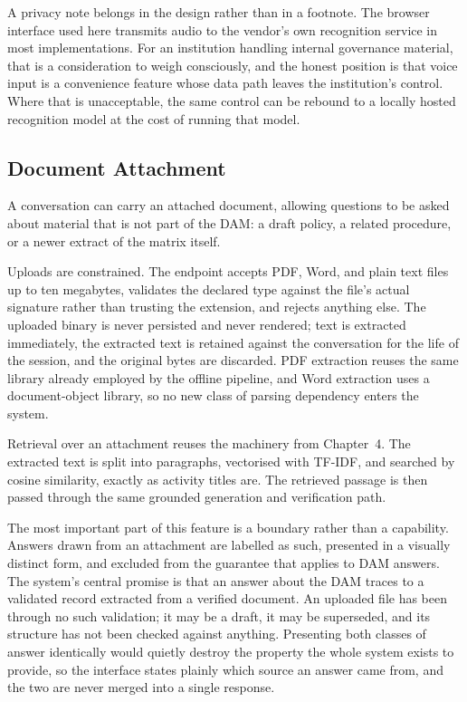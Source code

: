 A privacy note belongs in the design rather than in a footnote. The browser interface used here transmits audio to the vendor's own recognition service in most implementations. For an institution handling internal governance material, that is a consideration to weigh consciously, and the honest position is that voice input is a convenience feature whose data path leaves the institution's control. Where that is unacceptable, the same control can be rebound to a locally hosted recognition model at the cost of running that model.

\subsection{Document Attachment}

A conversation can carry an attached document, allowing questions to be asked about material that is not part of the DAM: a draft policy, a related procedure, or a newer extract of the matrix itself.

Uploads are constrained. The endpoint accepts PDF, Word, and plain text files up to ten megabytes, validates the declared type against the file's actual signature rather than trusting the extension, and rejects anything else. The uploaded binary is never persisted and never rendered; text is extracted immediately, the extracted text is retained against the conversation for the life of the session, and the original bytes are discarded. PDF extraction reuses the same library already employed by the offline pipeline, and Word extraction uses a document-object library, so no new class of parsing dependency enters the system.

Retrieval over an attachment reuses the machinery from Chapter~4. The extracted text is split into paragraphs, vectorised with TF-IDF, and searched by cosine similarity, exactly as activity titles are. The retrieved passage is then passed through the same grounded generation and verification path.

The most important part of this feature is a boundary rather than a capability. Answers drawn from an attachment are labelled as such, presented in a visually distinct form, and excluded from the guarantee that applies to DAM answers. The system's central promise is that an answer about the DAM traces to a validated record extracted from a verified document. An uploaded file has been through no such validation; it may be a draft, it may be superseded, and its structure has not been checked against anything. Presenting both classes of answer identically would quietly destroy the property the whole system exists to provide, so the interface states plainly which source an answer came from, and the two are never merged into a single response.


